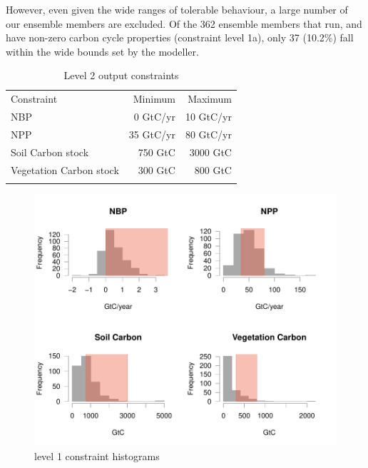 \documentclass[gmd, manuscript]{copernicus}
\begin{document}
However, even given the wide ranges of tolerable behaviour, a large number of our ensemble members are excluded. Of the 362 ensemble members that run, and have non-zero carbon cycle properties (constraint level 1a), only 37 (10.2\%) fall within the wide bounds set by the modeller.


\begin{table}[t]
\caption{Level 2 output constraints}
\label{table:level_2_constraints}
\begin{tabular}{l r r}
\tophline
Constraint & Minimum & Maximum \\ 
\middlehline
NBP & 0 GtC/yr &  10 GtC/yr\\
NPP & 35 GtC/yr & 80 GtC/yr \\
Soil Carbon stock & 750 GtC &  3000 GtC\\ 
Vegetation Carbon stock & 300 GtC & 800 GtC \\

\bottomhline
\end{tabular}
\belowtable{} %

\end{table}

\begin{figure}[t]
\includegraphics[width=12cm]{./graphics/level_2_constraints_hists.pdf}
\caption{level 1 constraint histograms}
\label{fig:level_2_constraints_hists}
\end{figure}
\end{document}
